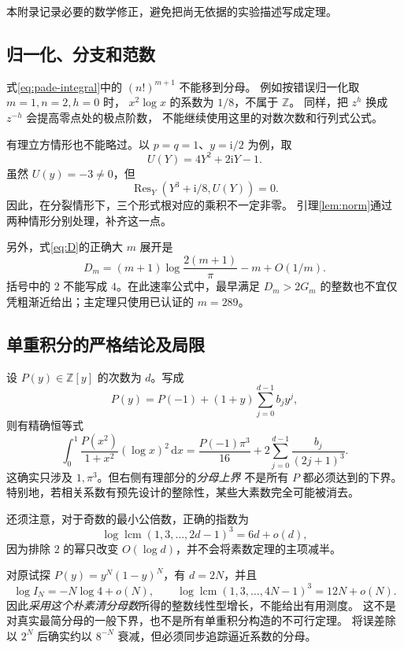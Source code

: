 \documentclass[UTF8,fontset=fandol,a4paper,11pt]{ctexart}
\theoremstyle{remark}
\newcommand{\Z}{\mathbb Z}
\newcommand{\ii}{\mathrm i}
\newcommand{\Res}{\operatorname{Res}}
\newcommand{\lcm}{\operatorname{lcm}}
\newcommand{\dd}{\,\mathrm d}
\numberwithin{equation}{section}
\begin{document}
本附录记录必要的数学修正，避免把尚无依据的实验描述写成定理。

\subsection{归一化、分支和范数}

式\eqref{eq:pade-integral}中的 $(n!)^{m+1}$ 不能移到分母。
例如按错误归一化取 $m=1,n=2,h=0$ 时，
$x^2\log x$ 的系数为 $1/8$，不属于 $\Z$。
同样，把 $z^h$ 换成 $z^{-h}$ 会提高零点处的极点阶数，
不能继续使用这里的对数次数和行列式公式。

有理立方情形也不能略过。以 $p=q=1$、$y=\ii/2$ 为例，取
\[
U(Y)=4Y^2+2\ii Y-1.
\]
虽然 $U(y)=-3\ne0$，但
\[
\Res_Y(Y^3+\ii/8,U(Y))=0.
\]
因此，在分裂情形下，三个形式根对应的乘积不一定非零。
引理\ref{lem:norm}通过两种情形分别处理，补齐这一点。

另外，式\eqref{eq:D}的正确大 $m$ 展开是
\[
D_m=(m+1)\log\frac{2(m+1)}{\pi}-m+O(1/m).
\]
括号中的 $2$ 不能写成 $4$。在此速率公式中，最早满足
$D_m>2G_m$ 的整数也不宜仅凭粗渐近给出；主定理只使用已认证的 $m=289$。

\subsection{单重积分的严格结论及局限}

设 $P(y)\in\Z[y]$ 的次数为 $d$。写成
\[
P(y)=P(-1)+(1+y)\sum_{j=0}^{d-1}b_jy^j,
\]
则有精确恒等式
\begin{equation}\label{eq:single-general}
\int_0^1\frac{P(x^2)}{1+x^2}(\log x)^2\dd x
=\frac{P(-1)\pi^3}{16}+2\sum_{j=0}^{d-1}\frac{b_j}{(2j+1)^3}.
\end{equation}
这确实只涉及 $1,\pi^3$。但右侧有理部分的\emph{分母上界}
不是所有 $P$ 都必须达到的下界。
特别地，若相关系数有预先设计的整除性，某些大素数完全可能被消去。

还须注意，对于奇数的最小公倍数，正确的指数为
\begin{equation}\label{eq:odd-lcm}
\log\lcm(1,3,\ldots,2d-1)^3=6d+o(d),
\end{equation}
因为排除 $2$ 的幂只改变 $O(\log d)$，并不会将素数定理的主项减半。

对原试探 $P(y)=y^N(1-y)^N$，有 $d=2N$，并且
\[
\log I_N=-N\log4+o(N),\qquad
\log\lcm(1,3,\ldots,4N-1)^3=12N+o(N).
\]
因此\emph{采用这个朴素清分母数}所得的整数线性型增长，不能给出有用测度。
这不是对真实最简分母的一般下界，也不是所有单重积分构造的不可行定理。
将误差除以 $2^N$ 后确实约以 $8^{-N}$ 衰减，但必须同步追踪逼近系数的分母。
\end{document}

